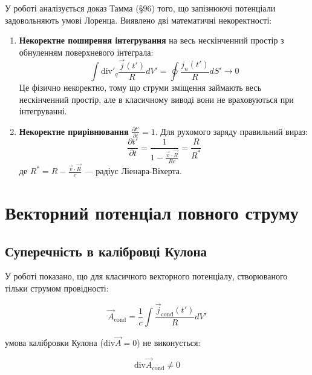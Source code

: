 \documentclass[12pt, a4paper]{article}
\begin{document}
У роботі \cite{LaggingPotentials} аналізується доказ Тамма (§96) того, що запізнюючі потенціали задовольняють умові Лоренца. Виявлено дві математичні некоректності:

\begin{enumerate}
    \item \textbf{Некоректне поширення інтегрування} на весь нескінченний простір з обнуленням поверхневого інтеграла:
    \begin{equation}
    \int \text{div}'_q \frac{\vec{j}(t')}{R} dV' = \oint \frac{j_n(t')}{R} dS' \longrightarrow 0
    \label{eq:gauss_error}
    \end{equation}
    Це фізично некоректно, тому що струми зміщення займають весь нескінченний простір, але в класичному виводі вони не враховуються при інтегруванні.

    \item \textbf{Некоректне прирівнювання} $\frac{\partial t'}{\partial t} = 1$. Для рухомого заряду правильний вираз:
    \begin{equation}
    \frac{\partial t'}{\partial t} = \frac{1}{1 - \frac{\vec{v} \cdot \vec{R}}{Rc}} = \frac{R}{R^*}
    \label{eq:retarded_time}
    \end{equation}
    де $R^* = R - \frac{\vec{v} \cdot \vec{R}}{c}$ --- радіус Ліенара-Віхерта.
\end{enumerate}

\section{Векторний потенціал повного струму}

\subsection{Суперечність в калібровці Кулона}

У роботі \cite{CoulombCalib} показано, що для класичного векторного потенціалу, створюваного тільки струмом провідності:

\begin{equation}
\vec{A}_{\text{cond}} = \frac{1}{c} \int \frac{\vec{j}_{\text{cond}}(t')}{R} dV'
\label{eq:vector_potential_cond}
\end{equation}

умова калібровки Кулона ($\text{div} \vec{A} = 0$) не виконується:

\begin{equation}
\text{div} \vec{A}_{\text{cond}} \neq 0
\label{eq:divergence_error}
\end{equation}
\end{document}
